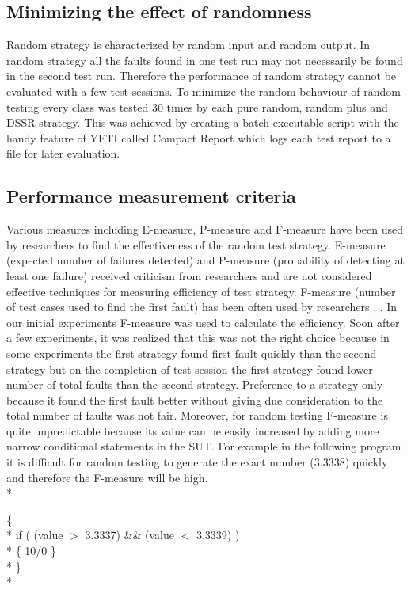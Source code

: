 \documentclass[conference]{IEEEtran}
\begin{document}
\subsection{Minimizing the effect of randomness}
\indent Random strategy is characterized by random input and random output. In random strategy all the faults found in one test run may not necessarily be found in the second test run. Therefore the performance of random strategy cannot be evaluated with a few test sessions. To minimize the random behaviour of random testing every class was tested 30 times by each pure random, random plus and DSSR strategy. This was achieved by creating a batch executable script with the handy feature of YETI called Compact Report which logs each test report to a file for later evaluation.

\subsection{Performance measurement criteria}
Various measures including E-measure, P-measure and F-measure have been used by researchers to find the effectiveness of the random test strategy. E-measure (expected number of failures detected) and P-measure (probability of detecting at least one failure) received criticism from researchers \cite{Chen2008} and are not considered effective techniques for measuring efficiency of test strategy. F-measure (number of test cases used to find the first fault) has been often used by researchers  \cite{Chen1996}, \cite{Chen2004}. In our initial experiments F-measure was used to calculate the efficiency. Soon after a few experiments, it was realized that this was not the right choice because in some experiments the first strategy found first fault quickly than the second strategy but on the completion of test session the first strategy found lower number of total faults than the second strategy. Preference to a strategy only because it found the first fault better without giving due consideration to the total number of faults was not fair. Moreover, for random testing F-measure is quite unpredictable because its value can be easily increased by adding more narrow conditional statements in the SUT. For example in the following program it is difficult for random testing to generate the exact number (3.3338) quickly and therefore the F-measure will be high.\\*

\begingroup
    \fontsize{7pt}{8pt}\selectfont
\noindent
\{ \\*
\indent if ( (value $>$  3.3337) \&\& (value $<$ 3.3339) )\\*
\indent \{ 10/0 \} \\* 
\} \\*
\endgroup
  
\end{document}
